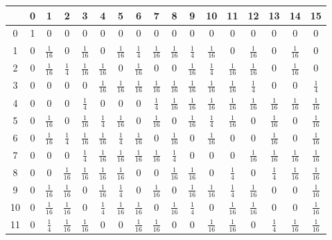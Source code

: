 \begin{refsegment}
\begin{table}
\begin{center}
\begin{tabular}{|c|cccccccccccccccc|} \hline
 &0&1&2&3&4&5&6&7&8&9&10&11&12&13&14&15\\
\hline
 0&1&0&0&0&0&0&0&0&0&0&0&0&0&0&0&0\\
 1&0&$\frac{1}{16}$&0&$\frac{1}{16}$&0&$\frac{1}{16}$&$\frac{1}{4}$&$\frac{1}{16}$&$\frac{1}{16}$&$\frac{1}{4}$&$\frac{1}{16}$&0&$\frac{1}{16}$&0&$\frac{1}{16}$&0\\
 2&0&$\frac{1}{16}$&$\frac{1}{4}$&$\frac{1}{16}$&$\frac{1}{16}$&0&$\frac{1}{16}$&0&0&$\frac{1}{16}$&$\frac{1}{4}$&$\frac{1}{16}$&$\frac{1}{16}$&0&$\frac{1}{16}$&0\\
 3&0&0&0&0&$\frac{1}{16}$&$\frac{1}{16}$&$\frac{1}{16}$&$\frac{1}{16}$&$\frac{1}{16}$&$\frac{1}{16}$&$\frac{1}{16}$&$\frac{1}{16}$&$\frac{1}{4}$&0&0&$\frac{1}{4}$\\
 4&0&0&0&$\frac{1}{4}$&0&0&0&$\frac{1}{4}$&$\frac{1}{16}$&$\frac{1}{16}$&$\frac{1}{16}$&$\frac{1}{16}$&$\frac{1}{16}$&$\frac{1}{16}$&$\frac{1}{16}$&$\frac{1}{16}$\\
 5&0&$\frac{1}{16}$&0&$\frac{1}{16}$&$\frac{1}{4}$&$\frac{1}{16}$&0&$\frac{1}{16}$&0&$\frac{1}{16}$&$\frac{1}{4}$&$\frac{1}{16}$&0&$\frac{1}{16}$&0&$\frac{1}{16}$\\
 6&0&$\frac{1}{16}$&$\frac{1}{4}$&$\frac{1}{16}$&$\frac{1}{16}$&$\frac{1}{4}$&$\frac{1}{16}$&0&$\frac{1}{16}$&0&$\frac{1}{16}$&0&0&$\frac{1}{16}$&0&$\frac{1}{16}$\\
 7&0&0&0&$\frac{1}{4}$&$\frac{1}{16}$&$\frac{1}{16}$&$\frac{1}{16}$&$\frac{1}{16}$&$\frac{1}{4}$&0&0&0&$\frac{1}{16}$&$\frac{1}{16}$&$\frac{1}{16}$&$\frac{1}{16}$\\
 8&0&0&$\frac{1}{16}$&$\frac{1}{16}$&$\frac{1}{16}$&$\frac{1}{16}$&0&0&$\frac{1}{16}$&$\frac{1}{16}$&0&$\frac{1}{4}$&0&$\frac{1}{4}$&$\frac{1}{16}$&$\frac{1}{16}$\\
 9&0&$\frac{1}{16}$&$\frac{1}{16}$&0&$\frac{1}{16}$&$\frac{1}{4}$&0&$\frac{1}{16}$&0&$\frac{1}{16}$&$\frac{1}{16}$&$\frac{1}{4}$&$\frac{1}{16}$&0&0&$\frac{1}{16}$\\
10&0&$\frac{1}{16}$&$\frac{1}{16}$&0&$\frac{1}{4}$&$\frac{1}{16}$&$\frac{1}{16}$&0&$\frac{1}{16}$&$\frac{1}{4}$&0&$\frac{1}{16}$&$\frac{1}{16}$&0&0&$\frac{1}{16}$\\
11&0&$\frac{1}{4}$&$\frac{1}{16}$&$\frac{1}{16}$&0&0&$\frac{1}{16}$&$\frac{1}{16}$&0&0&$\frac{1}{16}$&$\frac{1}{16}$&0&$\frac{1}{4}$&$\frac{1}{16}$&$\frac{1}{16}$\\

\end{tabular}
\end{center}
\end{table}
\end{refsegment}
